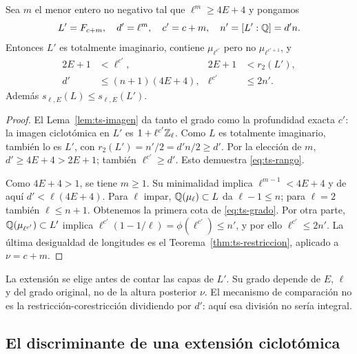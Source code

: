 \begin{proposicion}
\label{prop:ts-extension}
Sea $m$ el menor entero no negativo tal que $\ell^m\ge4E+4$ y pongamos
\begin{equation}
 L'=F_{c+m},\quad d'=\ell^m,\quad c'=c+m,\quad n'=[L':\mathbb{Q}]=d'n.
 \label{eq:ts-aux}
\end{equation}
Entonces $L'$ es totalmente imaginario, contiene $\mu_{\ell^{c'}}$ pero no $\mu_{\ell^{c'+1}}$, y
\begin{align}
 2E+1&<\ell^{c'}, & 2E+1&<r_2(L'),\label{eq:ts-rango}\\
 d'&\le(n+1)(4E+4), & \ell^{c'}&\le2n'.\label{eq:ts-grado}
\end{align}
Además $s_{\ell,E}(L)\le s_{\ell,E}(L')$.
\end{proposicion}
\begin{proof}
El Lema~\ref{lem:ts-imagen} da tanto el grado como la profundidad exacta $c'$: la imagen ciclotómica en $L'$ es $1+\ell^{c'}\mathbb{Z}_\ell$. Como $L$ es totalmente imaginario, también lo es $L'$, con $r_2(L')=n'/2=d'n/2\ge d'$. Por la elección de $m$, $d'\ge4E+4>2E+1$; también $\ell^{c'}\ge d'$. Esto demuestra \eqref{eq:ts-rango}.

Como $4E+4>1$, se tiene $m\ge1$. Su minimalidad implica $\ell^{m-1}<4E+4$ y de aquí $d'<\ell(4E+4)$. Para $\ell$ impar, $\mathbb{Q}(\mu_\ell)\subset L$ da $\ell-1\le n$; para $\ell=2$ también $\ell\le n+1$. Obtenemos la primera cota de \eqref{eq:ts-grado}. Por otra parte, $\mathbb{Q}(\mu_{\ell^{c'}})\subset L'$ implica $\ell^{c'}(1-1/\ell)=\phi(\ell^{c'})\le n'$, y por ello $\ell^{c'}\le2n'$. La última desigualdad de longitudes es el Teorema~\ref{thm:ts-restriccion}, aplicado a $\nu=c+m$.
\end{proof}

La extensión se elige antes de contar las capas de $L'$. Su grado depende de $E$, $\ell$ y del grado original, no de la altura posterior $\nu$. El mecanismo de comparación no es la restricción-corestricción dividiendo por $d'$: aquí esa división no sería integral.

\subsection{El discriminante de una extensión ciclotómica}

